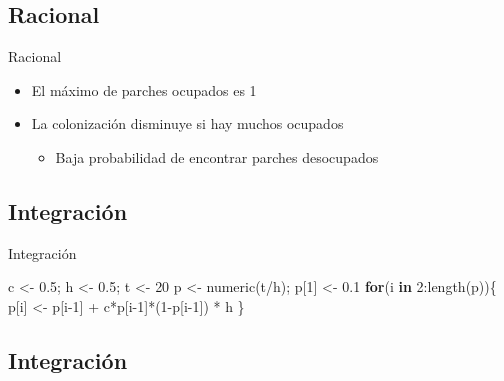 \documentclass[
  11pt,
  ignorenonframetext,
]{beamer}
\newenvironment{Shaded}{}{}
\newcommand{\ControlFlowTok}[1]{\textcolor[rgb]{0.00,0.44,0.13}{\textbf{#1}}}
\newcommand{\DecValTok}[1]{\textcolor[rgb]{0.25,0.63,0.44}{#1}}
\newcommand{\FloatTok}[1]{\textcolor[rgb]{0.25,0.63,0.44}{#1}}
\newcommand{\FunctionTok}[1]{\textcolor[rgb]{0.02,0.16,0.49}{#1}}
\newcommand{\NormalTok}[1]{#1}
\newcommand{\OtherTok}[1]{\textcolor[rgb]{0.00,0.44,0.13}{#1}}
\newcommand{\SpecialCharTok}[1]{\textcolor[rgb]{0.25,0.44,0.63}{#1}}
\providecommand{\tightlist}{%
  \setlength{\itemsep}{0pt}\setlength{\parskip}{0pt}}
\begin{document}
\hypertarget{racional}{%
\subsection{Racional}\label{racional}}

\begin{frame}{Racional}
\begin{itemize}
\item
  El máximo de parches ocupados es 1
\item
  La colonización disminuye si hay muchos ocupados

  \begin{itemize}
  \tightlist
  \item
    Baja probabilidad de encontrar parches desocupados
  \end{itemize}
\end{itemize}
\end{frame}

\hypertarget{integraciuxf3n}{%
\subsection{Integración}\label{integraciuxf3n}}

\begin{frame}[fragile]{Integración}
\begin{Shaded}
\begin{Highlighting}[]
\NormalTok{c }\OtherTok{\textless{}{-}} \FloatTok{0.5}\NormalTok{; h }\OtherTok{\textless{}{-}} \FloatTok{0.5}\NormalTok{; t }\OtherTok{\textless{}{-}} \DecValTok{20}
\NormalTok{p }\OtherTok{\textless{}{-}} \FunctionTok{numeric}\NormalTok{(t}\SpecialCharTok{/}\NormalTok{h); p[}\DecValTok{1}\NormalTok{] }\OtherTok{\textless{}{-}} \FloatTok{0.1}
\ControlFlowTok{for}\NormalTok{(i }\ControlFlowTok{in} \DecValTok{2}\SpecialCharTok{:}\FunctionTok{length}\NormalTok{(p))\{}
\NormalTok{  p[i] }\OtherTok{\textless{}{-}}\NormalTok{ p[i}\DecValTok{{-}1}\NormalTok{] }\SpecialCharTok{+}\NormalTok{ c}\SpecialCharTok{*}\NormalTok{p[i}\DecValTok{{-}1}\NormalTok{]}\SpecialCharTok{*}\NormalTok{(}\DecValTok{1}\SpecialCharTok{{-}}\NormalTok{p[i}\DecValTok{{-}1}\NormalTok{]) }\SpecialCharTok{*}\NormalTok{ h}
\NormalTok{\}}
\end{Highlighting}
\end{Shaded}
\end{frame}

\hypertarget{integraciuxf3n-1}{%
\subsection{Integración}\label{integraciuxf3n-1}}
\end{document}

